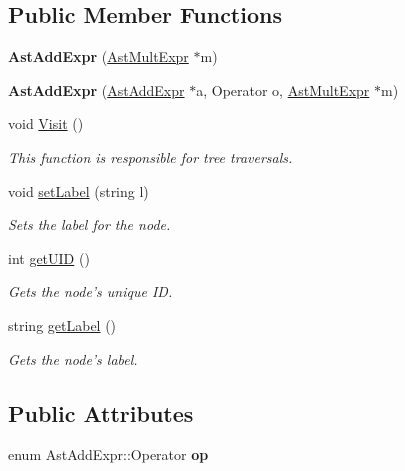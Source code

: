 \subsection*{Public Member Functions}
\begin{DoxyCompactItemize}
\item 
\hypertarget{classAstAddExpr_a62f5c5b3479834840ae3f18996354fe0}{{\bfseries Ast\-Add\-Expr} (\hyperlink{classAstMultExpr}{Ast\-Mult\-Expr} $\ast$m)}\label{classAstAddExpr_a62f5c5b3479834840ae3f18996354fe0}

\item 
\hypertarget{classAstAddExpr_a512bd2d176f23060ec0728d35ba1a492}{{\bfseries Ast\-Add\-Expr} (\hyperlink{classAstAddExpr}{Ast\-Add\-Expr} $\ast$a, Operator o, \hyperlink{classAstMultExpr}{Ast\-Mult\-Expr} $\ast$m)}\label{classAstAddExpr_a512bd2d176f23060ec0728d35ba1a492}

\item 
void \hyperlink{classAstAddExpr_a9b80132c7e2f4378ef699cd1de46fa01}{Visit} ()
\begin{DoxyCompactList}\small\item\em This function is responsible for tree traversals. \end{DoxyCompactList}\item 
void \hyperlink{classAST_a71d680856e95ff89f55d5311a552eba6}{set\-Label} (string l)
\begin{DoxyCompactList}\small\item\em Sets the label for the node. \end{DoxyCompactList}\item 
int \hyperlink{classAST_ab7a5b1d9f1c2de0d98deb356f724a42c}{get\-U\-I\-D} ()
\begin{DoxyCompactList}\small\item\em Gets the node's unique I\-D. \end{DoxyCompactList}\item 
string \hyperlink{classAST_aee029be902fffc927d16ccb03eb922ad}{get\-Label} ()
\begin{DoxyCompactList}\small\item\em Gets the node's label. \end{DoxyCompactList}\end{DoxyCompactItemize}
\subsection*{Public Attributes}
\begin{DoxyCompactItemize}
\item 
\hypertarget{classAstAddExpr_a005d101860301c927403c051fcf2b8a6}{enum Ast\-Add\-Expr\-::\-Operator {\bfseries op}}\label{classAstAddExpr_a005d101860301c927403c051fcf2b8a6}

\end{DoxyCompactItemize}
